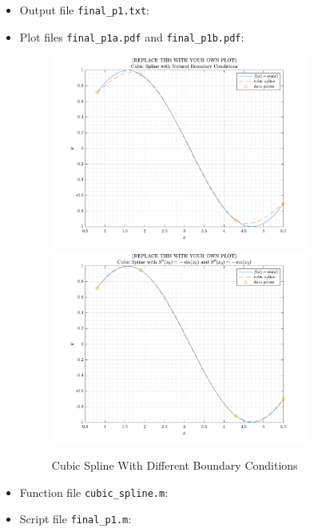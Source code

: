 \begin{solution}
  \quad
  \begin{itemize}
    \item Output file \verb|final_p1.txt|:
      
    \item Plot files \verb|final_p1a.pdf| and \verb|final_p1b.pdf|:
      \begin{figure}[!hbtp]
        \centering
        \includegraphics[width=0.8\textwidth]{../src/final_p1a.pdf}
        \includegraphics[width=0.8\textwidth]{../src/final_p1b.pdf}
        \caption{Cubic Spline With Different Boundary Conditions}
        \label{fig:p1}
      \end{figure}
    \newpage
    \item Function file \verb|cubic_spline.m|:
      
    \item Script file \verb|final_p1.m|:
      
  \end{itemize}
\end{solution}

